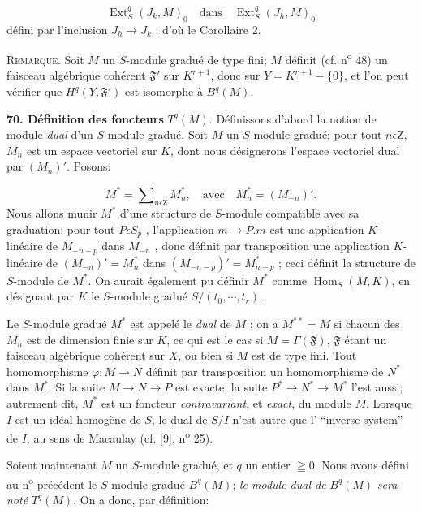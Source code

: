 \begin{equation*}
\operatorname{Ext}_S^q(J_k , M)_0 \quad \text{dans} \quad \operatorname{Ext}_S^q(J_h , M)_0
\end{equation*}
défini par l'inclusion $J_h \to J_k$ ; d'où le Corollaire 2.

\textsc{Remarque}. Soit $M$ un $S$-module gradué de type fini; $M$ définit (cf. n\textsuperscript{o} 48) un faisceau algébrique cohérent $\mathfrak{F}'$ sur $K^{r+1}$, donc sur $Y = K^{r+1} - \{0\}$, et l'on peut vérifier que $H^q(Y, \mathfrak{F}')$ est isomorphe à $B^q(M)$.

\textbf{70. Définition des foncteurs} $T^q(M)$. Définissons d'abord la notion de module \textit{dual} d'un $S$-module gradué. Soit $M$ un $S$-module gradué; pour tout $n \epsilon \mathrm{Z}$, $M_n$ est un espace vectoriel sur $K$, dont nous désignerons l'espace vectoriel dual par $(M_n)'$. Posons:

\begin{equation*}
M^* = \sum\nolimits_{n \epsilon \mathrm{Z}} M_n^* , \quad \text{avec} \quad M_n^* = (M_{-n})'.
\end{equation*}
Nous allons munir $M^*$ d'une structure de $S$-module compatible avec sa graduation; pour tout $P \epsilon S_p$ , l'application $m \to P.m$ est une application $K$-linéaire de $M_{-n-p}$ dans $M_{-n}$ , donc définit par transposition une application $K$-linéaire de $(M_{-n})' = M_n^*$ dans $(M_{-n-p})' = M_{n+p}^*$ ; ceci définit la structure de $S$-module de $M^*$. On aurait également pu définir $M^*$ comme $\operatorname{Hom}_S(M, K)$, en désignant par $K$ le $S$-module gradué $S/(t_0 , \cdots , t_r)$.

Le $S$-module gradué $M^*$ est appelé le \textit{dual} de $M$ ; on a $M^{**} = M$ si chacun des $M_n$ est de dimension finie sur $K$, ce qui est le cas si $M = \Gamma(\mathfrak{F})$, $\mathfrak{F}$ étant un faisceau algébrique cohérent sur $X$, ou bien si $M$ est de type fini. Tout homomorphisme $\varphi : M \to N$ définit par transposition un homomorphisme de $N^*$ dans $M^*$. Si la suite $M \to N \to P$ est exacte, la suite $P^* \to N^* \to M^*$ l'est aussi; autrement dit, $M^*$ est un foncteur \textit{contravariant}, et \textit{exact}, du module $M$. Lorsque $I$ est un idéal homogène de $S$, le dual de $S/I$ n'est autre que l' ``inverse system'' de $I$, au sens de Macaulay (cf. [9], n\textsuperscript{o} 25).

Soient maintenant $M$ un $S$-module gradué, et $q$ un entier $\geqq 0$. Nous avons défini au n\textsuperscript{o} précédent le $S$-module gradué $B^q(M)$; \textit{le module dual de} $B^q(M)$ \textit{sera noté} $T^q(M)$. On a donc, par définition:

